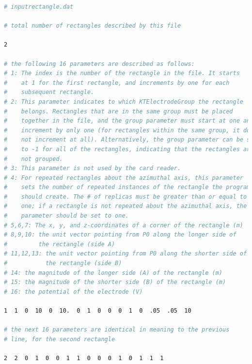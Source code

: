 \documentclass[11pt,a4paper,oneside]{article}
\begin{document}
\begin{lstlisting}[language=sh]
# inputrectangle.dat

# total number of rectangles described by this file

2

# the following 16 parameters are described as follows:
# 1: The index is the number of the rectangle in the file. It starts
#    at 1 for the first rectangle, and increments by one for each
#    subsequent rectangle.
# 2: This parameter indicates to which KTElectrodeGroup the rectangle
#    belongs. Rectangles that are in the same group must be placed
#    together in the file, and the group parameter must start at one and
#    increment by only one (for rectangles within the same group, it does
#    not increment at all). Alternatively, the group parameter can be set
#    to -1 for all of the rectangles, indicating that the rectangles are
#    not grouped.
# 3: This parameter is not used by the card reader.
# 4: For repeated rectangles about the azimuthal axis, this parameter
#    sets the number of repeated instances of the rectangle the program
#    should create. The # of replicas must be greater than or equal to
#    one; if a rectangle is not repeated about the azimuthal axis, the
#    parameter should be set to one.
# 5,6,7: The x, y, and z-coordinates of a corner of the rectangle (m)
# 8,9,10: the unit vector pointing from P0 along the longer side of
#         the rectangle (side A)
# 11,12,13: the unit vector pointing from P0 along the shorter side of
#           the rectangle (side B)
# 14: the magnitude of the longer side (A) of the rectangle (m)
# 15: the magnitude of the shorter side (B) of the rectangle (m)
# 16: the potential of the electrode (V)

1  1  0  10  0  10.  0  1  0  0  0  1  0  .05  .05  10

# the next 16 parameters are identical in meaning to the previous
# line, for the second rectangle

2  2  0  1  0  0  1  1  0  0  0  1  0  1  1  1
\end{lstlisting}
%
\end{document}
